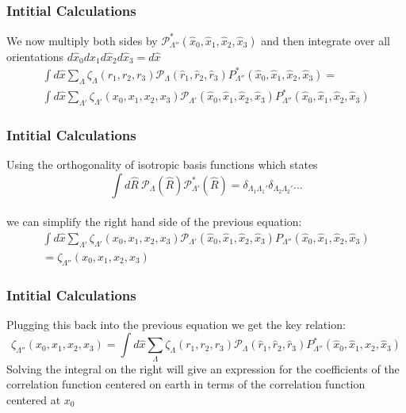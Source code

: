 \documentclass{beamer}
\begin{document}
    \begin{frame}
        \frametitle{Intitial Calculations}
        We now multiply both sides by $\mathcal P_{\Lambda ''}^*(\hat x_0, \hat x_1, \hat x_2, \hat x_3)$ and then integrate over all orientations
        $d \hat x_0 d \hat x_1 d \hat x_2 d \hat x_3 = d \hat x$
        \begin{eqnarray*}
            \int d \hat x \sum_{\Lambda} \zeta_{\Lambda}(r_1, r_2, r_3) \mathcal P_{\Lambda}(\hat r_1, \hat r_2, \hat r_3) P^*_{\Lambda ''}(\hat x_0, \hat x_1, \hat x_2, \hat x_3) = \\
            \int d \hat x \sum_{\Lambda '} \zeta_{\Lambda '}(x_0, x_1, x_2, x_3) \mathcal P_{\Lambda '}(\hat x_0, \hat x_1, \hat x_2, \hat x_3) P^*_{\Lambda ''}(\hat x_0, \hat x_1, \hat x_2, \hat x_3)
        \end{eqnarray*}
    \end{frame}

    \begin{frame}
        \frametitle{Intitial Calculations}
        Using the orthogonality of isotropic basis functions which states\\
        $$\int d \hat R \ \mathcal P_{\Lambda}(\hat R) \mathcal P^*_{\Lambda'}(\hat R) = \delta_{\Lambda_1 \Lambda_1'}\delta_{\Lambda_2 \Lambda_2'}...$$\\
        we can simplify the right hand side of the previous equation:
        \begin{multline*}
            \int d \hat x \sum_{\Lambda '} \zeta_{\Lambda '}(x_0, x_1, x_2, x_3) \mathcal P_{\Lambda '}(\hat x_0, \hat x_1, \hat x_2, \hat x_3) P_{\Lambda ''}(\hat x_0, \hat x_1, \hat x_2, \hat x_3)\\
            =\zeta_{\Lambda ''}(x_0, x_1, x_2, x_3)
        \end{multline*}
    \end{frame}

    \begin{frame}
        \frametitle{Intitial Calculations}
        Plugging this back into the previous equation we get the key relation:
        \begin{equation}
        \boxed{\zeta_{\Lambda ''}(x_0, x_1, x_2, x_3) = \int d \hat x \sum_{\Lambda} \zeta_{\Lambda}(r_1, r_2, r_3) \mathcal P_{\Lambda}(\hat r_1, \hat r_2, \hat r_3) P^*_{\Lambda ''}(\hat x_0, \hat x_1, \hat x_2, \hat x_3)}
        \end{equation}
        Solving the integral on the right will
        give an expression for the coefficients of the correlation function centered 
        on earth in terms of the correlation function centered at $x_0$
    \end{frame}
\end{document}
